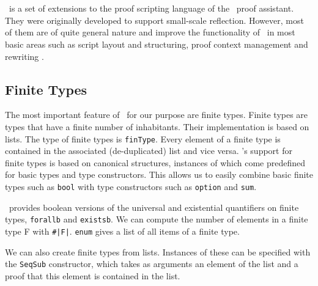 \section{\ssreflect}


\ssreflect\ is a set of extensions to the proof scripting language of the \coq\ proof assistant. 
They were originally developed to support small-scale reflection. 
However, most of them are of quite general nature and improve the functionality of \coq\ in most basic areas such as script layout and structuring, proof context management and rewriting \cite{gonthier:inria-00258384}.


\subsection{Finite Types} %

The most important feature of \ssreflect\ for our purpose are finite types.  
Finite types are types that have a finite number of inhabitants.
Their implementation is based on lists.
The type of finite types is \lstinline{finType}.
Every element of a finite type is contained in the associated (de-duplicated) list and vice versa.
\ssreflect's support for finite types is based on canonical structures, instances of which come predefined for basic types and type constructors. 
This allows us to easily combine basic finite types such as \lstinline{bool} with type constructors such as \lstinline{option} and \lstinline{sum}. 

\ssreflect\ provides boolean versions of the universal and existential quantifiers on finite types, \lstinline{forallb} and \lstinline{existsb}.
We can compute the number of elements in a finite type F with \lstinline{#|F|}.
\lstinline{enum} gives a list of all items of a finite type. 

We can also create finite types from lists.
Instances of these can be specified with the \lstinline{SeqSub} constructor, 
which takes as arguments an element of the list and a proof that this element is contained in the list.



